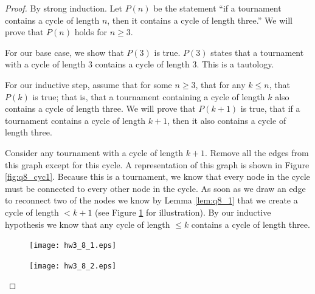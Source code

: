 \documentclass[10pt,letter]{article}
\begin{document}
\begin{proof} By strong induction. Let $P(n)$ be the statement ``if a tournament contains a cycle of length $n$, then it contains a cycle of length three.'' We will prove that $P(n)$ holds for $n \ge 3$. 

For our base case, we show that $P(3)$ is true. $P(3)$ states that a tournament with a cycle of length 3 contains a cycle of length 3. This is a tautology. 

For our inductive step, assume that for some $n \ge 3$, that for any $k \le n$, that $P(k)$ is true; that is, that a tournament containing a cycle of length $k$ also contains a cycle of length three. We will prove that $P(k+1)$ is true, that if a tournament contains a cycle of length $k+1$, then it also contains a cycle of length three.

Consider any tournament with a cycle of length $k+1$. Remove all the edges from this graph except for this cycle. A representation of this graph is shown in Figure \ref{fig:q8_cyc1}. Because this is a tournament, we know that every node in the cycle must be connected to every other node in the cycle. As soon as we draw an edge to reconnect two of the nodes we know by Lemma \ref{lem:q8_1} that we create a cycle of length $< k+1$ (see Figure \ref{fig:q8_cyc2} for illustration). By our inductive hypothesis we know that any cycle of length $\le k$ contains a cycle of length three. 

\begin{figure}[h]
\centering
\begin{minipage}{.5\textwidth}
  \centering
  \texttt{[image: hw3\_8\_1.eps]}
  \label{fig:q8_cyc1}
\end{minipage}%
\begin{minipage}{.5\textwidth}
  \centering
  \texttt{[image: hw3\_8\_2.eps]}
  \label{fig:q8_cyc2}
\end{minipage}
\end{figure}

\end{proof}

\end{document}
